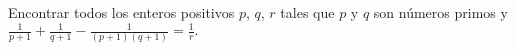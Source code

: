Encontrar todos los enteros positivos $p$, $q$, $r$ tales que $p$ y $q$ son números primos y $\frac{1}{p+1}+\frac{1}{q+1}-\frac{1}{(p+1)(q+1)} = \frac{1}{r}.$
